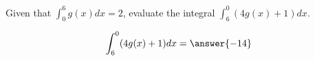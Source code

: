 \documentclass{ximera}
\author{Gregory Hartman \and Matthew Carr \and Bobby Ramsey}
\begin{document}
\begin{exercise}


Given that $\displaystyle \int_{0}^{6}g(x)dx=2$, evaluate the integral $\displaystyle \int_{6}^{0}(4g(x)+1)dx$.

\[ \int_{6}^{0}(4g(x)+1)dx = \answer{-14}\]


\end{exercise}
\end{document}
